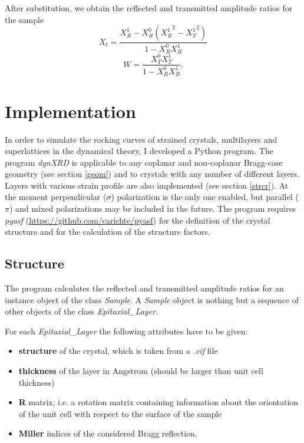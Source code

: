 \documentclass[12pt,oneside,notitlepage,abstracton,a4paper]{scrartcl}
\begin{document}
After substitution, we obtain the reflected and transmitted amplitude ratios for the sample
\begin{equation}\label{refl}
 X_t=\frac{X_R^1-X_R^0({X_R^1}^2-{X_T^1}^2)}{1-X_R^0 X_R^1}
\end{equation}
\begin{equation}\label{trans}
 W=\frac{X_T^0 X_T^1}{1-X_R^0 X_R^1}.
\end{equation}





\section{Implementation}

In order to simulate the rocking curves of strained crystals, multilayers and superlattices in the dynamical theory, I developed a Python program. The program \textit{dynXRD} is applicable to any coplanar and non-coplanar Bragg-case geometry (see section \ref{geom}) and to crystals with any number of different layers. Layers with various strain profile are also implemented (see section \ref{strcr}). At the moment perpendicular ($\sigma$) polarization is the only one enabled, but parallel ($\pi$) and mixed polarizations may be included in the future. The program requires \textit{pyasf} (\url{https://github.com/carichte/pyasf}) for the definition of the crystal structure and for the calculation of the structure factors.


\subsection{Structure}
The program calculates the reflected and transmitted amplitude ratios for an instance object of the class \textit{Sample}. A \textit{Sample} object is nothing but a sequence of other objects of the class \textit{Epitaxial\_Layer}.

For each \textit{Epitaxial\_Layer} the following attributes have to be given:
\begin{itemize}
 \item \textbf{structure} of the crystal, which is taken from a \textit{.cif} file
 \item \textbf{thickness} of the layer in Angstrom (should be larger than unit cell thickness)
 \item \textbf{R} matrix, i.e. a rotation matrix containing information about the orientation of the unit cell with respect to the surface of the sample
 \item \textbf{Miller} indices of the considered Bragg reflection.
\end{itemize}
\end{document}
